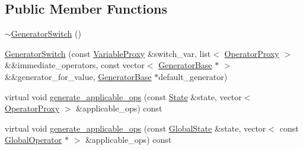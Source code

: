 \subsection*{Public Member Functions}
\begin{DoxyCompactItemize}
\item 
\hyperlink{classGeneratorSwitch_a661f59b8cb03bfb5a91c501d37d7c9aa}{$\sim$\-Generator\-Switch} ()
\item 
\hyperlink{classGeneratorSwitch_a88ec7f0dfb491c4327b2b8b49230cb7d}{Generator\-Switch} (const \hyperlink{classVariableProxy}{Variable\-Proxy} \&switch\-\_\-var, list$<$ \hyperlink{classOperatorProxy}{Operator\-Proxy} $>$ \&\&immediate\-\_\-operators, const vector$<$ \hyperlink{classGeneratorBase}{Generator\-Base} $\ast$ $>$ \&\&generator\-\_\-for\-\_\-value, \hyperlink{classGeneratorBase}{Generator\-Base} $\ast$default\-\_\-generator)
\item 
virtual void \hyperlink{classGeneratorSwitch_afc8348b9849312455a93dce02898958a}{generate\-\_\-applicable\-\_\-ops} (const \hyperlink{classState}{State} \&state, vector$<$ \hyperlink{classOperatorProxy}{Operator\-Proxy} $>$ \&applicable\-\_\-ops) const 
\item 
virtual void \hyperlink{classGeneratorSwitch_ae90fed245667ca900fdd61121307ccbc}{generate\-\_\-applicable\-\_\-ops} (const \hyperlink{classGlobalState}{Global\-State} \&state, vector$<$ const \hyperlink{classGlobalOperator}{Global\-Operator} $\ast$ $>$ \&applicable\-\_\-ops) const 
\end{DoxyCompactItemize}


